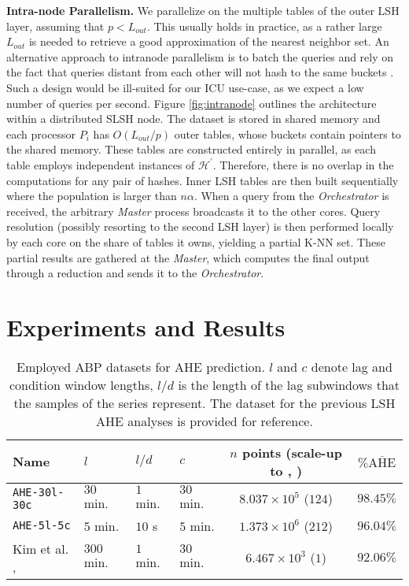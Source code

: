 \documentclass{article}
\begin{document}
\textbf{Intra-node Parallelism.}
We parallelize on the multiple tables of the outer LSH layer, assuming that $p < L_{out}$. This usually holds in practice, as a rather large $L_{out}$ is needed to retrieve a good approximation of the nearest neighbor set. An alternative approach to intranode parallelism is to batch the queries and rely on the fact that queries distant from each other will not hash to the same buckets \cite{Sundaram}. Such a design would be ill-suited for our ICU use-case, as we expect a low number of queries per second.
%
Figure \ref{fig:intranode} outlines the architecture within a distributed SLSH node.
The dataset is stored in shared memory and each processor $P_i$ has $O(L_{out}/p)$ outer tables, whose buckets contain pointers to the shared memory.
These tables are constructed entirely in parallel, as each table employs independent instances of $\mathcal{H^\prime}$. Therefore, there is no overlap in the computations for any pair of hashes.
Inner LSH tables are then built sequentially where the population is larger than $n \alpha$.
When a query from the \textit{Orchestrator} is received, the arbitrary \textit{Master} process broadcasts it to the other cores. Query resolution (possibly resorting to the second LSH layer) is then performed locally by each core on the share of tables it owns, yielding a partial K-NN set. These partial results are gathered at the \textit{Master}, which computes the final output through a reduction and sends it to the \textit{Orchestrator}.


\section{Experiments and Results}

\begin{table}[t]
	\small
	\centering
	\caption{Employed ABP datasets for AHE prediction. $l$ and $c$ denote lag and condition window lengths, $l/d$ is the length of the lag subwindows that the samples of the series represent. The dataset for the previous LSH AHE analyses is provided for reference.}
	\begin{tabular}{llllcc}
		\toprule
		Name     & $l$ & $l/d$ & $c$ & $n$ points (scale-up to \cite{SLSHretrieval}, \cite{LSHprediction}) &  $\%\overline{\text{AHE}}$ \\
		\midrule
		\texttt{AHE-30l-30c} & $30$ min. & $1$ min. & $30$ min. & $8.037 \times 10^5$ ($124$) & $98.45\%$ \\
		\texttt{AHE-5l-5c}   & $5$ min. & $10$ s & $5$ min. & $1.373 \times 10^6$ ($212$) & $96.04\%$  \\
		Kim et al. \cite{SLSHretrieval}, \cite{LSHprediction}   & $300$ min. & $1$ min. & $30$ min. & $6.467 \times 10^3$ ($1$) & $92.06\%$  \\
		\bottomrule
	\end{tabular}
	\label{table}
\end{table}
\end{document}
